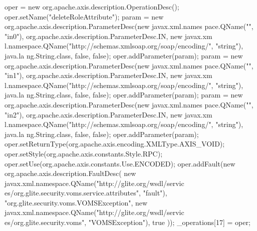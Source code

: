 \begin{DoxyCode}
{        oper = new org.apache.axis.description.OperationDesc();
        oper.setName("deleteRoleAttribute");
        param = new org.apache.axis.description.ParameterDesc(new javax.xml.names
      pace.QName("", "in0"), org.apache.axis.description.ParameterDesc.IN, new javax.xm
      l.namespace.QName("http://schemas.xmlsoap.org/soap/encoding/", "string"), java.la
      ng.String.class, false, false);
        oper.addParameter(param);
        param = new org.apache.axis.description.ParameterDesc(new javax.xml.names
      pace.QName("", "in1"), org.apache.axis.description.ParameterDesc.IN, new javax.xm
      l.namespace.QName("http://schemas.xmlsoap.org/soap/encoding/", "string"), java.la
      ng.String.class, false, false);
        oper.addParameter(param);
        param = new org.apache.axis.description.ParameterDesc(new javax.xml.names
      pace.QName("", "in2"), org.apache.axis.description.ParameterDesc.IN, new javax.xm
      l.namespace.QName("http://schemas.xmlsoap.org/soap/encoding/", "string"), java.la
      ng.String.class, false, false);
        oper.addParameter(param);
        oper.setReturnType(org.apache.axis.encoding.XMLType.AXIS_VOID);
        oper.setStyle(org.apache.axis.constants.Style.RPC);
        oper.setUse(org.apache.axis.constants.Use.ENCODED);
        oper.addFault(new org.apache.axis.description.FaultDesc(
                      new javax.xml.namespace.QName("http://glite.org/wsdl/servic
      es/org.glite.security.voms.service.attributes", "fault"),
                      "org.glite.security.voms.VOMSException",
                      new javax.xml.namespace.QName("http://glite.org/wsdl/servic
      es/org.glite.security.voms", "VOMSException"), 
                      true
                     ));
        _operations[17] = oper;

}
\end{DoxyCode}
